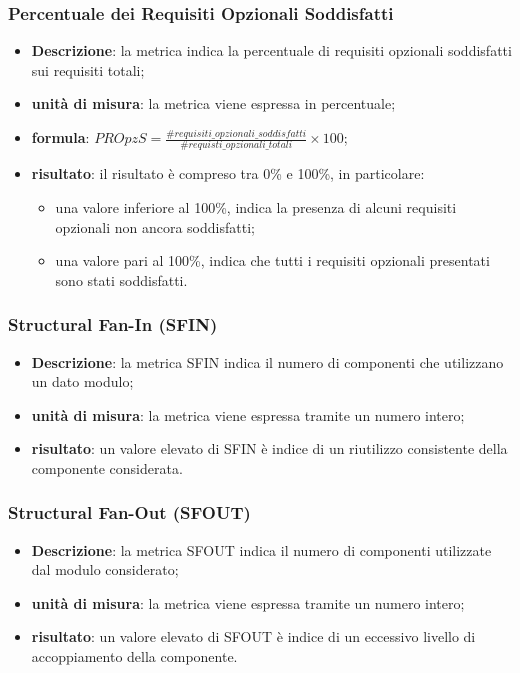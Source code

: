 		\subsubsection*{Percentuale dei Requisiti Opzionali Soddisfatti}
		\begin{itemize}
			\item{\textbf{Descrizione}}: la metrica indica la percentuale di requisiti opzionali soddisfatti sui requisiti totali;
			\item{\textbf{unità di misura}}: la metrica viene espressa in percentuale;
			\item{\textbf{formula}}: $ PROpzS = \displaystyle\frac{\#requisiti\_opzionali\_soddisfatti}{\#requisti\_opzionali\_totali}\times100$;
			\item{\textbf{risultato}}: il risultato è compreso tra 0\% e 100\%, in particolare:
			\begin{itemize}
				\item una valore inferiore al 100\%, indica la presenza di alcuni requisiti opzionali non ancora soddisfatti;
				\item una valore pari al 100\%, indica che tutti i requisiti opzionali presentati sono stati soddisfatti.
			\end{itemize}
		\end{itemize}

		\subsubsection*{Structural Fan-In (SFIN)}
		\begin{itemize}
			\item{\textbf{Descrizione}}: la metrica SFIN indica il numero di componenti che utilizzano un dato modulo;
			\item{\textbf{unità di misura}}: la metrica viene espressa tramite un numero intero;
			\item{\textbf{risultato}}: un valore elevato di SFIN è indice di un riutilizzo consistente della componente considerata.
		\end{itemize}

		\subsubsection*{Structural Fan-Out (SFOUT)}
		\begin{itemize}
			\item{\textbf{Descrizione}}: la metrica SFOUT indica il numero di componenti utilizzate dal modulo considerato;
			\item{\textbf{unità di misura}}: la metrica viene espressa tramite un numero intero;
			\item{\textbf{risultato}}: un valore elevato di SFOUT è indice di un eccessivo livello di accoppiamento della componente.
		\end{itemize}

